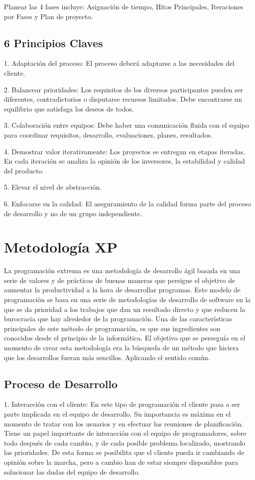 \documentclass{article}
\begin{document}
Planear las 4 fases incluye: Asignaci\'on de tiempo, Hitos Principales, Iteraciones por Fases y Plan de proyecto.

\subsection{6 Principios Claves}

1. Adaptaci\'on del proceso: El proceso deber\'a adaptarse a las necesidades del cliente.

2. Balancear prioridades: Los requisitos de los diversos participantes pueden ser diferentes, contradictorios o disputarse recursos limitados. Debe encontrarse un equilibrio que satisfaga los deseos de todos. 

3. Colaboraci\'on entre equipos: Debe haber una comunicaci\'on fluida con el equipo para coordinar requisitos, desarrollo, evaluaciones, planes, resultados.

4. Demostrar valor iterativamente: Los proyectos se entregan en etapas iteradas. En cada iteraci\'on se analiza la opini\'on de los inversores, la estabilidad y calidad del producto.

5. Elevar el nivel de abstracci\'on.

6. Enfocarse en la calidad: El aseguramiento de la calidad forma parte del proceso de desarrollo y no de un grupo independiente.

\section{Metodolog\'ia XP}
La programaci\'on extrema es una metodolog\'ia de desarrollo \'agil basada en una serie de valores y de pr\'acticas de buenas maneras que persigue el objetivo de aumentar la productividad a la hora de desarrollar programas.
Este modelo de programaci\'on se basa en una serie de metodolog\'ias de desarrollo de software en la que se da prioridad a los trabajos que dan un resultado directo y que reducen la burocracia que hay alrededor de la programaci\'on.
Una de las caracter\'isticas principales de este m\'etodo de programaci\'on, es que sus ingredientes son conocidos desde el principio de la inform\'atica. El objetivo que se persegu\'ia en el momento de crear esta metodolog\'ia era la b\'usqueda de un m\'etodo que hiciera que los desarrollos fueran m\'as sencillos. Aplicando el sentido com\'un.

\subsection{Proceso de Desarrollo}
1. Interacci\'on con el cliente: En este tipo de programaci\'on el cliente pasa a ser parte implicada en el equipo de desarrollo. Su importancia es m\'axima en el momento de tratar con los usuarios y en efectuar las reuniones de planificaci\'on. Tiene un papel importante de interacci\'on con el equipo de programadores, sobre todo despu\'es de cada cambio, y de cada posible problema localizado, mostrando las prioridades. De esta forma se posibilita que el cliente pueda ir cambiando de opini\'on sobre la marcha, pero a cambio han de estar siempre disponibles para solucionar las dudas del equipo de desarrollo.
\end{document}
